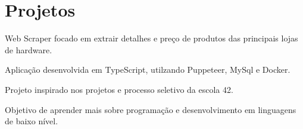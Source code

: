\documentclass[]{deedy-resume-openfont}
\begin{document}
\begin{minipage}[t]{0.63\textwidth}

\section{Projetos} 
\begin{tightemize}
    \item Web Scraper focado em extrair detalhes e preço de produtos das principais lojas de hardware.
    \item Aplicação desenvolvida em TypeScript, utilzando Puppeteer, MySql e Docker.
\end{tightemize}
\sectionsep

\begin{tightemize}
    \item Projeto inspirado nos projetos e processo seletivo da escola 42.
    \item Objetivo de aprender mais sobre programação e desenvolvimento em linguagens de baixo nível.
\end{tightemize}
\sectionsep

\end{minipage} 
\end{document}
